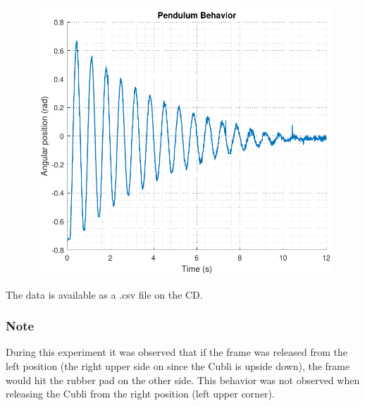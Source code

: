 \begin{minipage}{\linewidth}
\begin{minipage}{0.45\linewidth}
\begin{figure}[H]
			\includegraphics[scale=.53]{figures/PendRad}
			\centering
			\vspace{-.4cm}
			\captionsetup{justification=centering}
			\label{PendRad}
		\end{figure}%
	\end{minipage}
\end{minipage} 

The data is available as a .csv file on the CD.

\subsubsection{Note}
During this experiment it was observed that if the frame was released from the left position (the right upper side on  since the Cubli is upside down), the frame would hit the rubber pad on the other side. This behavior was not observed when releasing the Cubli from the right position (left upper corner).

